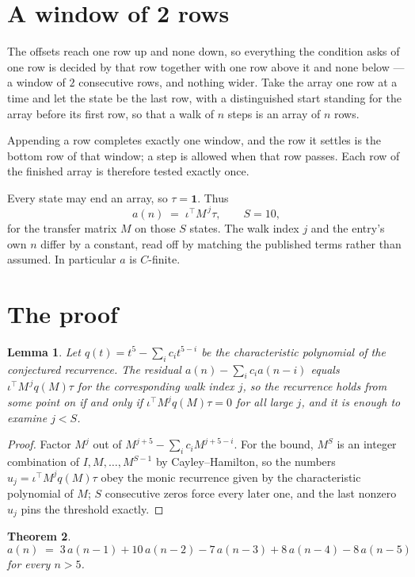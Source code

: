 \documentclass[11pt,a4paper]{article}
\theoremstyle{plain}
\newtheorem{theorem}{Theorem}
\newtheorem{lemma}[theorem]{Lemma}
\theoremstyle{definition}
\begin{document}
\section{A window of 2 rows}

The offsets reach one row up and none down, so everything the condition asks of one row is
decided by that row together with one row above it and none below --- a window of
$2$ consecutive rows, and nothing wider. Take the array one row at a time
and let the state be the last row, with a distinguished start standing for the
array before its first row, so that a walk of $n$ steps is an array of $n$ rows.

Appending a row completes exactly one window, and the row it settles is the bottom row of that window; a step is
allowed when that row passes. Each row of the finished
array is therefore tested exactly once.

Every state may end an array, so $\tau=\mathbf{1}$.
Thus
\[
a(n)\;=\;\iota^{\!\top}M^{\,j}\tau ,\qquad S=10,
\]
for the transfer matrix $M$ on those $S$ states. The walk index $j$ and the entry's own $n$
differ by a constant, read off by matching the published terms rather than assumed. In
particular $a$ is $C$-finite.

\section{The proof}

\begin{lemma}\label{lem:crit}
Let $q(t)=t^{5}-\sum_i c_it^{5-i}$ be the characteristic polynomial of the
conjectured recurrence. The residual $a(n)-\sum_ic_ia(n-i)$ equals
$\iota^{\!\top}M^{\,j}q(M)\tau$ for the corresponding walk index $j$, so the recurrence
holds from some point on if and only if $\iota^{\!\top}M^{j}q(M)\tau=0$ for all large $j$,
and it is enough to examine $j<S$.
\end{lemma}

\begin{proof}
Factor $M^{j}$ out of $M^{j+5}-\sum_ic_iM^{j+5-i}$. For the bound, $M^{S}$
is an integer combination of $I,M,\dots,M^{S-1}$ by Cayley--Hamilton, so the numbers
$u_j=\iota^{\!\top}M^{j}q(M)\tau$ obey the monic recurrence given by the characteristic
polynomial of $M$; $S$ consecutive zeros force every later one, and the last nonzero $u_j$
pins the threshold exactly.
\end{proof}

\begin{theorem}
\[
a(n)\;=\;3\,a(n-1) + 10\,a(n-2) - 7\,a(n-3) + 8\,a(n-4) - 8\,a(n-5)
\]
for every $n>5$.
\end{theorem}
\end{document}
